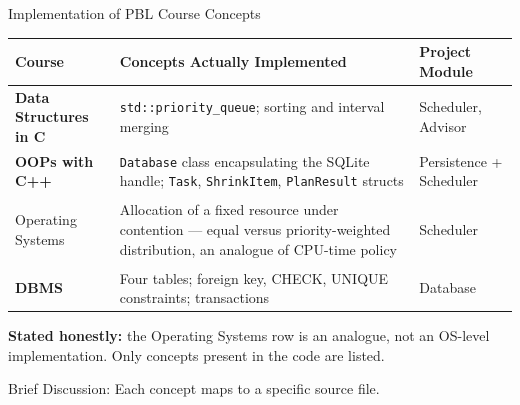 \documentclass[aspectratio=169,11pt]{beamer}
\newcommand{\smallnote}[1]{%
\vspace{0.08cm}
{\scriptsize\color{GEUGrey}#1}
}
\begin{document}
\begin{frame}{Implementation of PBL Course Concepts}

\scriptsize

\begin{center}

\renewcommand{\arraystretch}{1.25}

\begin{tabularx}{.96\textwidth}
{@{}>{\bfseries}p{2.6cm}X p{2.6cm}@{}}

\toprule
Course & Concepts Actually Implemented & Project Module\\
\midrule

Data Structures in C &
\texttt{std::priority\_queue}; sorting and interval merging &
Scheduler, Advisor\\

OOPs with C++ &
\texttt{Database} class encapsulating the SQLite handle; \texttt{Task},
\texttt{ShrinkItem}, \texttt{PlanResult} structs &
Persistence + Scheduler\\

\midrule

Operating Systems &
Allocation of a fixed resource under contention --- equal versus
priority-weighted distribution, an analogue of CPU-time policy &
Scheduler\\

DBMS &
Four tables; foreign key, CHECK, UNIQUE constraints; transactions &
Database\\

\bottomrule

\end{tabularx}

\end{center}

\vfill

\begin{center}
\colorbox{GEULightBlue}{
\parbox{.88\textwidth}{
\centering
\textbf{Stated honestly:}
the Operating Systems row is an analogue, not an OS-level implementation.
Only concepts present in the code are listed.
}}
\end{center}

\smallnote{
Brief Discussion: Each concept maps to a specific source file.
}

\end{frame}
\end{document}
